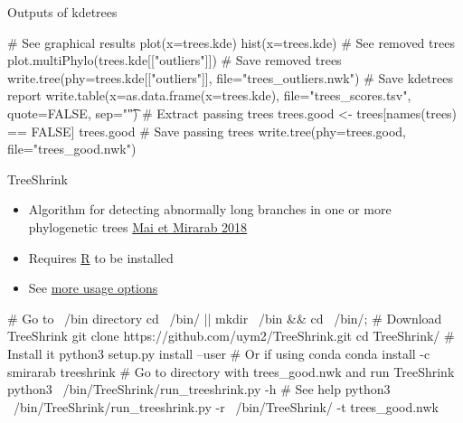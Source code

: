 \documentclass[compress, ucs, xelatex, 11pt, xcolor=x11names, aspectratio=169,
	hyperref={
		bookmarks=true,
		unicode=true,
		colorlinks=true,
		pdftitle={HybSeq course},
		plainpages=false,
		pdfauthor={Vojtech Zeisek},
		pdfsubject={Practical processing of HybSeq target enrichment sequencing data on computing grids like MetaCentrum},
		pdfcreator={XeLaTeX},
		pdfkeywords={BASH, command line, GNU, HybSeq, Linux, MetaCentrum, sequencing shell, target enrichment},
		linkcolor=Turquoise4, %
		anchorcolor=DodgerBlue4, %
		citecolor=DodgerBlue4, %
		filecolor=DodgerBlue4, %
		menucolor=Tan4, %
		urlcolor=DarkOliveGreen4, %
		pdftex},
	url={hyphens, lowtilde} %
	]{beamer}
\begin{document}
\begin{frame}[fragile]{Outputs of kdetrees}
	\begin{spluscode}
    # See graphical results
    plot(x=trees.kde)
    hist(x=trees.kde)
    # See removed trees
    plot.multiPhylo(trees.kde[["outliers"]])
    # Save removed trees
    write.tree(phy=trees.kde[["outliers"]], file="trees_outliers.nwk")
    # Save kdetrees report
    write.table(x=as.data.frame(x=trees.kde), file="trees_scores.tsv",
      quote=FALSE, sep="\t")
    # Extract passing trees
    trees.good <- trees[names(trees) %
      == FALSE]
    trees.good
    # Save passing trees
    write.tree(phy=trees.good, file="trees_good.nwk")
	\end{spluscode}
\end{frame}

\begin{frame}[fragile]{TreeShrink}
	\begin{itemize}
		\item Algorithm for detecting abnormally long branches in one or more phylogenetic trees \href{https://bmcgenomics.biomedcentral.com/articles/10.1186/s12864-018-4620-2}{Mai et Mirarab 2018}
		\item Requires \href{https://www.r-project.org/}{R} to be installed
		\item See \href{https://github.com/uym2/TreeShrink}{more usage options}
	\end{itemize}
	\begin{bashcode}
    # Go to ~/bin directory
    cd ~/bin/ || { mkdir ~/bin && cd ~/bin/; }
    # Download TreeShrink
    git clone https://github.com/uym2/TreeShrink.git
    cd TreeShrink/
    # Install it
    python3 setup.py install --user # Or if using conda
    conda install -c smirarab treeshrink
    # Go to directory with trees_good.nwk and run TreeShrink
    python3 ~/bin/TreeShrink/run_treeshrink.py -h # See help
    python3 ~/bin/TreeShrink/run_treeshrink.py -r ~/bin/TreeShrink/
      -t trees_good.nwk
	\end{bashcode}
\end{frame}
\end{document}
